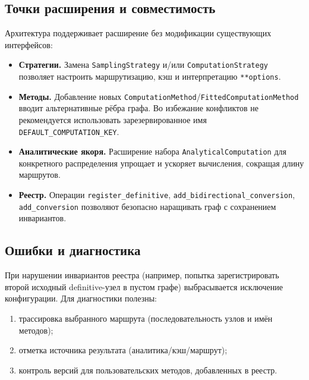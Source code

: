 \subsection{Точки расширения и совместимость}

Архитектура поддерживает расширение без модификации существующих интерфейсов:
\begin{itemize}
  \item \textbf{Стратегии.} Замена \texttt{SamplingStrategy} и/или \texttt{ComputationStrategy}
        позволяет настроить маршрутизацию, кэш и интерпретацию \texttt{**options}.
  \item \textbf{Методы.} Добавление новых \texttt{ComputationMethod}/\texttt{FittedComputationMethod}
        вводит альтернативные рёбра графа. Во избежание конфликтов не рекомендуется использовать
        зарезервированное имя \texttt{DEFAULT\_COMPUTATION\_KEY}.
  \item \textbf{Аналитические якоря.} Расширение набора \texttt{AnalyticalComputation} для конкретного
        распределения упрощает и ускоряет вычисления, сокращая длину маршрутов.
  \item \textbf{Реестр.} Операции \texttt{register\_definitive}, \texttt{add\_bidirectional\_conversion},
        \texttt{add\_conversion} позволяют безопасно наращивать граф с сохранением инвариантов.
\end{itemize}

\subsection{Ошибки и диагностика}

При нарушении инвариантов реестра (например, попытка зарегистрировать второй исходный definitive-узел в
пустом графе) выбрасывается исключение конфигурации. Для диагностики полезны:
\begin{enumerate}
  \item трассировка выбранного маршрута (последовательность узлов и имён методов);
  \item отметка источника результата (аналитика/кэш/маршрут);
  \item контроль версий для пользовательских методов, добавленных в реестр.
\end{enumerate}
